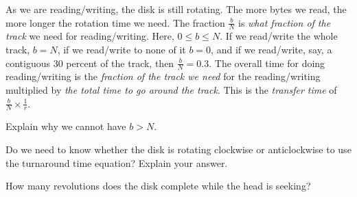 As we are reading/writing, the disk is still rotating. 
The more bytes we read, the more longer the rotation time we 
need. The fraction $\frac{b}{N}$ is \textit{what fraction of the track} we need for 
reading/writing. Here, $0 \leqslant b \leqslant N$. If we read/write the whole track, $b = N$, 
if we read/write to none of it $b = 0$, and if we 
read/write, say, a contiguous 30 percent of the track, then $\frac{b}{N} = 0.3$. 
The overall time for doing reading/writing is the \textit{fraction of the track we need} 
for the reading/writing multiplied by \textit{the total time to go around the track}.
This is the \textit{transfer time} of $\frac{b}{N} \times \frac{1}{r}$. 

\frmrule


\frmrule

\begin{example}
Explain why we cannot have $b > N$.
\end{example}

\begin{example}
Do we need to know whether the disk is rotating clockwise or anticlockwise to use 
the turnaround time equation? Explain your answer.
\end{example}

\begin{example}
How many revolutions does the disk complete while the head is seeking?
\end{example}




\frmrule


